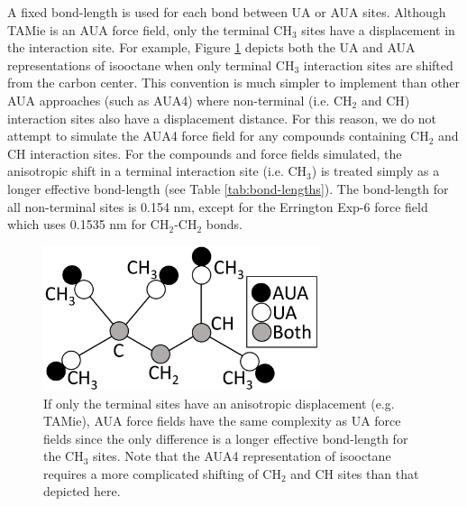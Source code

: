 \documentclass[preprint,letterpaper,floatfix,citeautoscript,aip,jcp]{revtex4-1}
\begin{document}
A fixed bond-length is used for each bond between UA or AUA sites. Although TAMie is an AUA force field, only the terminal CH$_3$ sites have a displacement in the interaction site. For example, Figure \ref{fig:AUA_isooctane} depicts both the UA and AUA representations of isooctane when only terminal CH$_3$ interaction sites are shifted from the carbon center. This convention is much simpler to implement than other AUA approaches (such as AUA4) where non-terminal (i.e. CH$_2$ and CH) interaction sites also have a displacement distance. For this reason, we do not attempt to simulate the AUA4 force field for any compounds containing CH$_2$ and CH interaction sites. For the compounds and force fields simulated, the anisotropic shift in a terminal interaction site (i.e. CH$_3$) is treated simply as a longer effective bond-length (see Table \ref{tab:bond-lengths}). The bond-length for all non-terminal sites is 0.154 nm, except for the Errington Exp-6 force field which uses 0.1535 nm for CH$_2$-CH$_2$ bonds.

\begin{figure}[htb!]
	\centering
	\includegraphics[width=3.2in]{AUA_isooctane}
	\caption{If only the terminal sites have an anisotropic displacement (e.g. TAMie), AUA force fields have the same complexity as UA force fields since the only difference is a longer effective bond-length for the CH$_3$ sites. Note that the AUA4 representation of isooctane requires a more complicated shifting of CH$_2$ and CH sites than that depicted here.}
	\label{fig:AUA_isooctane}
\end{figure}
\end{document}
